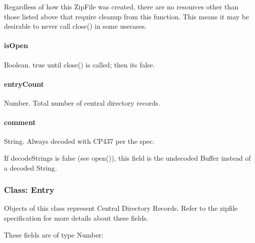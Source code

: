 Regardless of how this {\ttfamily Zip\+File} was created, there are no resources other than those listed above that require cleanup from this function. This means it may be desirable to never call {\ttfamily close()} in some usecases.

\paragraph*{is\+Open}

{\ttfamily Boolean}. {\ttfamily true} until {\ttfamily close()} is called; then it\textquotesingle{}s {\ttfamily false}.

\paragraph*{entry\+Count}

{\ttfamily Number}. Total number of central directory records.

\paragraph*{comment}

{\ttfamily String}. Always decoded with {\ttfamily C\+P437} per the spec.

If {\ttfamily decode\+Strings} is {\ttfamily false} (see {\ttfamily open()}), this field is the undecoded {\ttfamily Buffer} instead of a decoded {\ttfamily String}.

\subsubsection*{Class\+: Entry}

Objects of this class represent Central Directory Records. Refer to the zipfile specification for more details about these fields.

These fields are of type {\ttfamily Number}\+:


